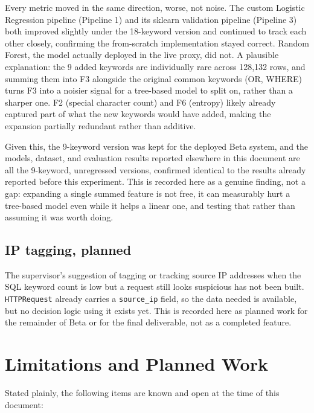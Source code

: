 \documentclass{llncs}
\begin{document}
Every metric moved in the same direction, worse, not noise. The custom
Logistic Regression pipeline (Pipeline 1) and its sklearn validation
pipeline (Pipeline 3) both improved slightly under the 18-keyword
version and continued to track each other closely, confirming the
from-scratch implementation stayed correct. Random Forest, the model
actually deployed in the live proxy, did not. A plausible explanation:
the 9 added keywords are individually rare across 128{,}132 rows, and
summing them into F3 alongside the original common keywords (OR,
WHERE) turns F3 into a noisier signal for a tree-based model to split
on, rather than a sharper one. F2 (special character count) and F6
(entropy) likely already captured part of what the new keywords would
have added, making the expansion partially redundant rather than
additive.

Given this, the 9-keyword version was kept for the deployed Beta
system, and the models, dataset, and evaluation results reported
elsewhere in this document are all the 9-keyword, unregressed
versions, confirmed identical to the results already reported before
this experiment. This is recorded here as a genuine finding, not a
gap: expanding a single summed feature is not free, it can measurably
hurt a tree-based model even while it helps a linear one, and testing
that rather than assuming it was worth doing.

\subsection{IP tagging, planned}
The supervisor's suggestion of tagging or tracking source IP addresses
when the SQL keyword count is low but a request still looks suspicious
has not been built. \texttt{HTTPRequest} already carries a
\texttt{source\_ip} field, so the data needed is available, but no
decision logic using it exists yet. This is recorded here as planned
work for the remainder of Beta or for the final deliverable, not as a
completed feature.

\clearpage
\section{Limitations and Planned Work}
\label{sec:limitations}

Stated plainly, the following items are known and open at the time of
this document:
\end{document}
